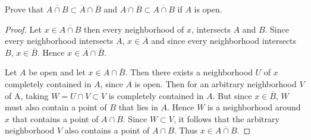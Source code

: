     \question 
    Prove that $\overline{A \cap B} \subset \overline{A} \cap \overline{B}$ and $A \cap \overline{B} \subset \overline{A \cap B}$ if $A$ is open. 
    \begin{proof}
        Let $x \in \overline{A \cap B}$ then every neighborhood of $x$, intersects $A$ and $B$. Since every neighborhood intersects $A$, 
        $x \in \overline{A}$ and since every neighborhood intersects $B$, $x \in \overline{B}$. Hence $x \in \overline{A} \cap \overline{B}$. 

        Let $A$ be open and let $x \in A \cap \overline{B}$. Then there exists a neighborhood $U$ of $x$ completely contained in $A$, since $A$ is open. 
        Then for an arbitrary neighborhood $V$ of A, taking $W = U \cap V \subset V$ is completely contained in $A$. But since $x \in \overline{B}$, 
        $W$ must also contain a point of $B$ that lies in $A$. Hence $W$ is a neighborhood around $x$ that contains a point of $A \cap B$. 
        Since $W \subset V$, it follows that the arbitrary neighborhood $V$ also contains a point of $A \cap B$. Thus $x \in \overline{A \cap B}$. 

    \end{proof}
